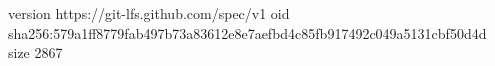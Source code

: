 version https://git-lfs.github.com/spec/v1
oid sha256:579a1ff8779fab497b73a83612e8e7aefbd4c85fb917492c049a5131cbf50d4d
size 2867
